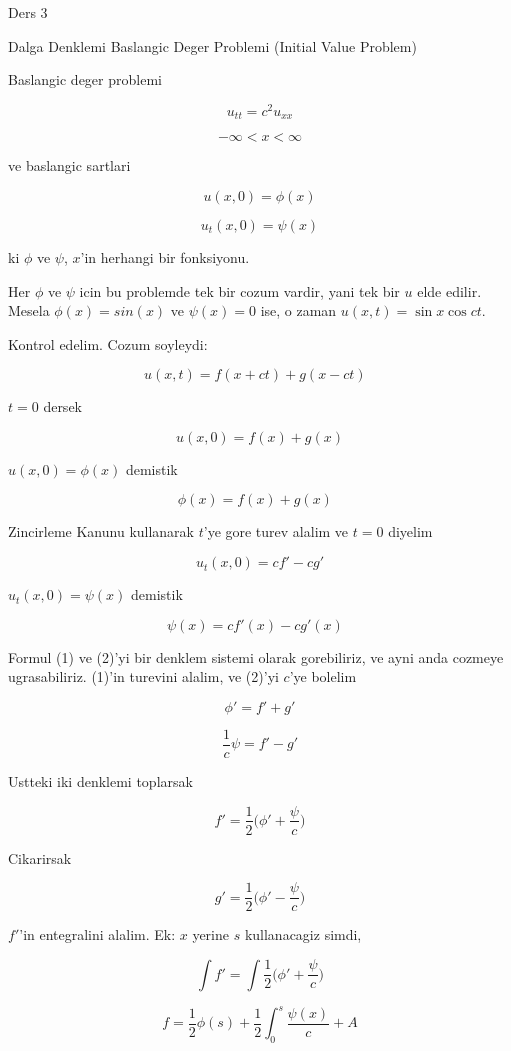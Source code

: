 \documentclass[12pt,fleqn]{article}\usepackage{../common}
\begin{document}
Ders 3

Dalga Denklemi Baslangic Deger Problemi (Initial Value Problem) 

Baslangic deger problemi 

\[ u_{tt} = c^2u_{xx} \]

\[ -\infty < x < \infty \]

ve baslangic sartlari 

\[ u(x,0) = \phi(x) \]

\[ u_t(x,0) = \psi(x) \]

ki $\phi$ ve $\psi$, $x$'in herhangi bir fonksiyonu. 

Her $\phi$ ve $\psi$ icin bu problemde tek bir cozum vardir, yani tek bir
$u$ elde edilir. Mesela $\phi(x) = sin(x)$ ve $\psi(x) = 0$ ise, o zaman
$u(x,t) = \sin x \cos ct$. 

Kontrol edelim. Cozum soyleydi:

\[ u(x,t) = f(x+ct) + g(x-ct) 
\ \ \ 
\label{5}
\]

$t=0$ dersek 

\[ u(x,0)  = f(x) + g(x) \]

$u(x,0) = \phi(x)$ demistik

\[ \phi(x) = f(x) + g(x) \ \ \ \label{1} \]

Zincirleme Kanunu kullanarak $t$'ye gore turev alalim ve $t=0$ diyelim

\[ u_t(x,0) = cf' - cg' \]

$u_t(x,0) = \psi(x)$ demistik

\[ \psi(x) = cf'(x) - cg'(x) \ \ \ \label{2} \]

Formul (1) ve (2)'yi bir denklem sistemi olarak gorebiliriz, ve ayni anda
cozmeye ugrasabiliriz. (1)'in turevini alalim, ve (2)'yi $c$'ye bolelim

\[ \phi' = f' + g' \]

\[ \frac{1}{c}\psi = f' - g' \]

Ustteki iki denklemi toplarsak

\[ f' = \frac{1}{2} \bigg( \phi' + \frac{\psi}{c}  \bigg) \]

Cikarirsak

\[ g' = \frac{1}{2}  \bigg( \phi' - \frac{\psi}{c}  \bigg) \]


$f'$'in entegralini alalim. Ek: $x$ yerine $s$ kullanacagiz simdi,

\[ \int f' = \int \frac{1}{2} \bigg( \phi' + \frac{\psi}{c}  \bigg) \]

\[ f = \frac{1}{2}\phi(s) + \frac{1}{2}\int_0^s \frac{\psi(x)}{c} + A\]
\end{document}
